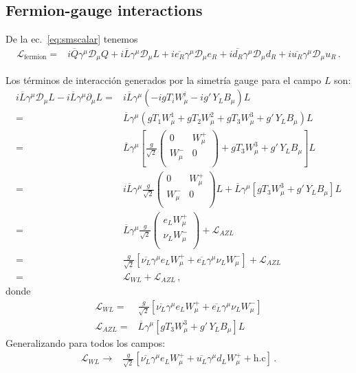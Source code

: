 \subsection{Fermion-gauge interactions}

\begin{frame}
De la ec.~\eqref{eq:smscalar} tenemos
\begin{align}
  \label{eq:lfermion}
  \mathcal{L}_{\text{fermion}}=&i\overline{Q}\gamma^\mu\mathcal{D}_\mu Q+i\overline{L}\gamma^\mu\mathcal{D}_\mu L+
i\overline{e_R}\gamma^\mu\mathcal{D}_\mu {e_R}+i\overline{d_R}\gamma^\mu\mathcal{D}_\mu {d_R}+i\overline{u_R}\gamma^\mu\mathcal{D}_\mu {u_R}\,.
\end{align}

Los términos de interacción generados por la simetría gauge para el campo $L$ son:
\begin{align}
  i\overline{L}\gamma^\mu\mathcal{D}_\mu L-i\overline{L}\gamma^\mu\partial_\mu L
=&i\overline{L}\gamma^\mu(-i g T_iW_\mu^i-i g'\,Y_LB_\mu) L\nonumber\\
=&\overline{L}\gamma^\mu(g T_1W_\mu^1+ g T_2W_\mu^2+g T_3W_\mu^3+g'\,Y_LB_\mu) L\nonumber\\
=&\overline{L}\gamma^\mu\left[\frac{g}{\sqrt{2}}
  \begin{pmatrix}
0 & W_\mu^+\\
W_\mu^- & 0\\    
  \end{pmatrix}
+g T_3W_\mu^3+g'\,Y_LB_\mu
\right]L\nonumber\\
=&i\overline{L}\gamma^\mu\frac{g}{\sqrt{2}}
  \begin{pmatrix}
0 & W_\mu^+\\
W_\mu^- & 0\\    
  \end{pmatrix}L+
\overline{L}\gamma^\mu\left[g T_3W_\mu^3+g'\,Y_LB_\mu
\right]L\nonumber\\
  =&\overline{L}\gamma^\mu\frac{g}{\sqrt{2}}
  \begin{pmatrix}
e_LW_\mu^+\\
\nu_L W_\mu^-\\    
  \end{pmatrix}+\mathcal{L}_{A Z L}\nonumber\\
  =&
\frac{g}{\sqrt{2}}\left[\overline{\nu_L}\gamma^\mu e_LW_\mu^++
\overline{e_L}\gamma^\mu\nu_L W_\mu^-\right]    
+\mathcal{L}_{A Z L}\nonumber\\
  =&
\mathcal{L}_{W L}    
+\mathcal{L}_{A Z L}\,,
\end{align}
donde
\begin{align}
  \mathcal{L}_{W L}=&\frac{g}{\sqrt{2}}\left[\overline{\nu_L}\gamma^\mu e_LW_\mu^++
\overline{e_L}\gamma^\mu\nu_L W_\mu^-\right]\nonumber\\    
  \mathcal{L}_{A Z L}=&\overline{L}\gamma^\mu\left[g T_3W_\mu^3+g'\,Y_LB_\mu\right]L
\end{align}
Generalizando para todos los campos:
\begin{align}
  \label{eq:wl}
   \mathcal{L}_{W L}\to&\frac{g}{\sqrt{2}}\left[\overline{\nu_L}\gamma^\mu e_LW_\mu^++
\overline{u_L}\gamma^\mu d_LW_\mu^++\text{h.c}\right]\,.
\end{align}



\end{frame}
